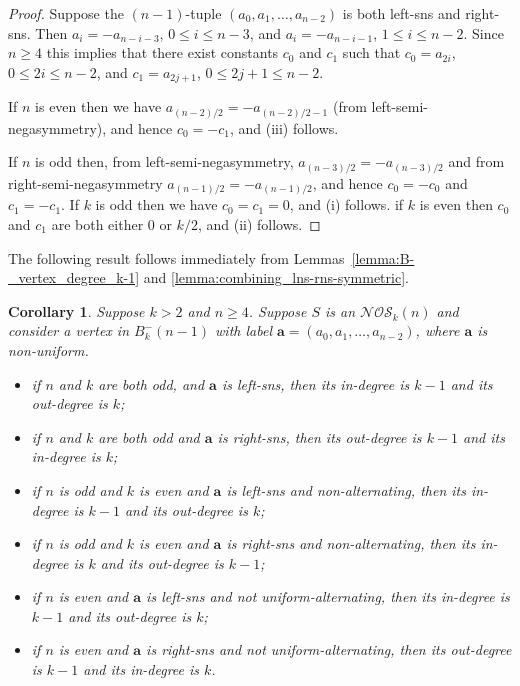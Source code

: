 \documentclass[a4paper,11pt]{article}
\theoremstyle{plain}
\newtheorem{corollary}[lemma]{Corollary}
\theoremstyle{definition}
\theoremstyle{remark}
\begin{document}
\begin{proof}
Suppose the $(n-1)$-tuple $(a_0,a_1,\ldots,a_{n-2})$ is both left-sns and right-sns. Then
$a_i=-a_{n-i-3}$, $0\leq i\leq n-3$, and $a_i=-a_{n-i-1}$, $1\leq i\leq n-2$.  Since $n\geq4$ this
implies that there exist constants $c_0$ and $c_1$ such that $c_0=a_{2i}$, $0\leq 2i\leq n-2$, and
$c_1=a_{2j+1}$, $0\leq 2j+1\leq n-2$.

If $n$ is even then we have $a_{(n-2)/2}=-a_{(n-2)/2-1}$ (from left-semi-negasymmetry), and hence
$c_0=-c_1$, and (iii) follows.

If $n$ is odd then, from left-semi-negasymmetry, $a_{(n-3)/2}=-a_{(n-3)/2}$ and from
right-semi-negasymmetry $a_{(n-1)/2}=-a_{(n-1)/2}$, and hence $c_0=-c_0$ and $c_1=-c_1$.  If $k$ is
odd then we have $c_0=c_1=0$, and (i) follows.  if $k$ is even then $c_0$ and $c_1$ are both either
0 or $k/2$, and (ii) follows.
\end{proof}

The following result follows immediately from Lemmas~\ref{lemma:B-_vertex_degree_k-1} and
\ref{lemma:combining_lns-rns-symmetric}.

\begin{corollary}  \label{corollary:nega-left-right-in-out}
Suppose $k>2$ and $n\geq4$. Suppose $S$ is an $\mathcal{NOS}_k(n)$ and consider a vertex in
$B_k^-(n-1)$ with label $\mathbf{a}=(a_0,a_1,\ldots,a_{n-2})$, where $\mathbf{a}$ is non-uniform.
\begin{itemize}
\item[i)] if $n$ and $k$ are both odd, and $\mathbf{a}$ is left-sns, then its in-degree is
    $k-1$ and its out-degree is $k$;
\item[ii)] if $n$ and $k$ are both odd and $\mathbf{a}$ is right-sns, then its out-degree is
    $k-1$ and its in-degree is $k$;
\item[iii)] if $n$ is odd and $k$ is even and $\mathbf{a}$ is left-sns and non-alternating,
    then its in-degree is $k-1$ and its out-degree is $k$;
\item[iv)] if $n$ is odd and $k$ is even and $\mathbf{a}$ is right-sns and non-alternating,
    then its in-degree is $k$ and its out-degree is $k-1$;
\item[v)] if $n$ is even and $\mathbf{a}$ is left-sns and not uniform-alternating, then its
    in-degree is $k-1$ and its out-degree is $k$;
\item[vi)] if $n$ is even and $\mathbf{a}$ is right-sns and not uniform-alternating, then its
    out-degree is $k-1$ and its in-degree is $k$.
\end{itemize}
\end{corollary}
\end{document}
